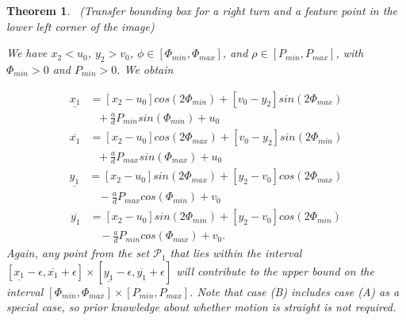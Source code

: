\documentclass[letterpaper, 10 pt, conference]{ieeeconf}  %
\newtheorem{theorem}{Theorem}
\begin{document}
\begin{theorem}\
\textit{(Transfer bounding box for a right turn and a feature point in the lower left corner of the image)}

We have $x_2 < u_0$, $y_2 > v_0$, $\phi\in[\Phi_{min}, \Phi_{max}]$, and $\rho\in[P_{min}, P_{max}]$, with $\Phi_{min} > 0$ and $P_{min} > 0$. We obtain

\begin{equation}
	\label{UB_Turn_Right_X_min}
	\begin{aligned}
		\underline{x_1} &= [x_2 - u_0] cos(2 \Phi_{min}) + [v_0 - y_2] sin(2 \Phi_{max}) \\
						&\ \ \ + \frac{a}{d} P_{min} sin(\Phi_{min}) + u_0
	\end{aligned}				
\end{equation}
\begin{equation}
	\label{UB_Turn_Right_X_max}
	\begin{aligned}
		\overline{x_1} &= [x_2 - u_0] cos(2 \Phi_{max}) + [v_0 - y_2] sin(2 \Phi_{min}) \\
					   &\ \ \ + \frac{a}{d} P_{max} sin(\Phi_{max}) + u_0
	\end{aligned}
\end{equation}
\begin{equation}
	\label{UB_Turn_Right_Y_min}
	\begin{aligned}
		\underline{y_1} &= [x_2 - u_0] sin(2 \Phi_{max}) + [y_2 - v_0] cos(2 \Phi_{max}) \\
		   				&\ \ \ \ - \frac{a}{d} P_{max} cos(\Phi_{min}) + v_0
	\end{aligned}
\end{equation}
\begin{equation}
	\label{UB_Turn_Right_Y_max}
	\begin{aligned}
		\overline{y_1} &= [x_2 - u_0] sin(2 \Phi_{min}) + [y_2 - v_0] cos(2 \Phi_{min}) \\
	   				   &\ \ \ \ - \frac{a}{d} P_{min} cos(\Phi_{max}) + v_0.
	\end{aligned}
\end{equation}
%
Again, any point from the set $\mathcal{P}_1$ that lies within the interval $[\underline{x_1}-\epsilon,\overline{x_1}+\epsilon] \times [\underline{y_1}-\epsilon,\overline{y_1}+\epsilon]$ will contribute to the upper bound on the interval $[\Phi_{min}, \Phi_{max}]\times[P_{min},P_{max}]$. Note that case (B) includes case (A) as a special case, so prior knowledge about whether motion is straight is not required.

\end{theorem}
\end{document}
